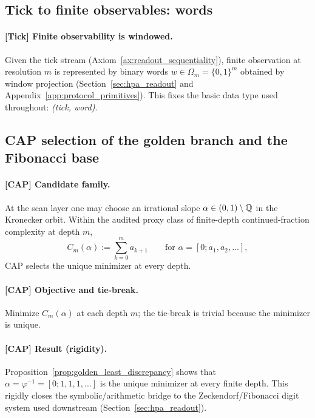 \subsection{Tick to finite observables: words}
\label{subsec:tick_cap_words}

\paragraph{[Tick] Finite observability is windowed.}
Given the tick stream (Axiom~\ref{ax:readout_sequentiality}), finite observation at resolution $m$ is represented by binary words $w\in\Omega_m=\{0,1\}^m$ obtained by window projection (Section~\ref{sec:hpa_readout} and Appendix~\ref{app:protocol_primitives}).
This fixes the basic data type used throughout: \emph{(tick, word)}.

\subsection{CAP selection of the golden branch and the Fibonacci base}
\label{subsec:tick_cap_golden_branch}

\paragraph{[CAP] Candidate family.}
At the scan layer one may choose an irrational slope $\alpha\in(0,1)\setminus\mathbb{Q}$ in the Kronecker orbit.
Within the audited proxy class of finite-depth continued-fraction complexity at depth $m$,
\[
C_m(\alpha):=\sum_{k=0}^{m} a_{k+1}\qquad\text{for }\alpha=[0;a_1,a_2,\dots],
\]
CAP selects the unique minimizer at every depth.

\paragraph{[CAP] Objective and tie-break.}
Minimize $C_m(\alpha)$ at each depth $m$; the tie-break is trivial because the minimizer is unique.

\paragraph{[CAP] Result (rigidity).}
Proposition~\ref{prop:golden_least_discrepancy} shows that $\alpha=\varphi^{-1}=[0;1,1,1,\dots]$ is the unique minimizer at every finite depth.
This rigidly closes the symbolic/arithmetic bridge to the Zeckendorf/Fibonacci digit system used downstream (Section~\ref{sec:hpa_readout}).

